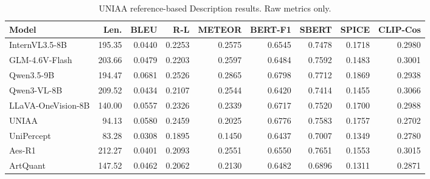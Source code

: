 \begin{table}[t]
\centering
\scriptsize
\setlength{\tabcolsep}{2.7pt}
\caption{UNIAA reference-based Description results. Raw metrics only.}
\begin{tabular}{lrrrrrrrr}
\toprule
Model & Len. & BLEU & R-L & METEOR & BERT-F1 & SBERT & SPICE & CLIP-Cos \\
\midrule
InternVL3.5-8B & 195.35 & 0.0440 & 0.2253 & 0.2575 & 0.6545 & 0.7478 & 0.1718 & 0.2980 \\
GLM-4.6V-Flash & 203.66 & 0.0479 & 0.2203 & 0.2597 & 0.6484 & 0.7592 & 0.1483 & 0.3001 \\
Qwen3.5-9B & 194.47 & 0.0681 & 0.2526 & 0.2865 & 0.6798 & 0.7712 & 0.1869 & 0.2938 \\
Qwen3-VL-8B & 209.52 & 0.0434 & 0.2107 & 0.2544 & 0.6420 & 0.7414 & 0.1455 & 0.3066 \\
LLaVA-OneVision-8B & 140.00 & 0.0557 & 0.2326 & 0.2339 & 0.6717 & 0.7520 & 0.1700 & 0.2988 \\
\midrule
UNIAA & 94.13 & 0.0580 & 0.2459 & 0.2025 & 0.6776 & 0.7583 & 0.1757 & 0.2702 \\
UniPercept & 83.28 & 0.0308 & 0.1895 & 0.1450 & 0.6437 & 0.7007 & 0.1349 & 0.2780 \\
Aes-R1 & 212.27 & 0.0401 & 0.2093 & 0.2551 & 0.6550 & 0.7651 & 0.1553 & 0.3015 \\
ArtQuant & 147.52 & 0.0462 & 0.2062 & 0.2130 & 0.6482 & 0.6896 & 0.1311 & 0.2871 \\
\bottomrule
\end{tabular}
\end{table}
